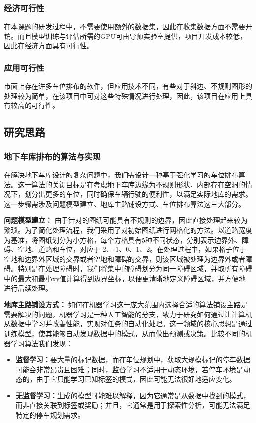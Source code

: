 \subsubsection{经济可行性}
在本课题的研发过程中，不需要使用额外的数据集，因此在收集数据方面不需要开销。而且模型训练与评估所需的GPU可由导师实验室提供，项目开发成本较低，因此在经济方面具有可行性。
\subsubsection{应用可行性}
市面上存在许多车位排布的软件，但应用技术不同，有些对于斜边、不规则图形的处理较为简单，在该项目中可对这些特殊情况进行处理，因此，该项目在应用上具有较高的可行性。
\subsection{研究思路}
\subsubsection{地下车库排布的算法与实现}
在解决地下车库设计的复杂问题中，我们需设计一种基于强化学习的车位排布算法。这一算法的关键目标是在考虑地下车库边缘为不规则形状、内部存在空洞的情况下，划分出更多的车位，同时确保车辆行驶的便利性，以满足实际地库的需求。这一步骤需涉及问题模型建立、地库主路铺设方式、车位排布算法这三大部分。

{\bfseries 问题模型建立：}
由于针对的图纸可能具有不规则的边界，因此直接处理起来较为繁琐。为了简化处理流程，我们采用了对初始图纸进行网格化的方法。以道路宽度为基准，将图纸划分为小方格，每个方格具有5种不同状态，分别表示边界外、障碍、空地、道路和车位，对应于-2、-1、0、1、2。在处理过程中，如果格子位于空地和边界外区域的交界或者空地和障碍的交界，则该区域被处理为边界外或者障碍。特别是在处理障碍时，我们将集中的障碍划分为同一障碍区域，并取所有障碍中的最大和最小xy值计算得到边界坐标，以便更清晰地定义障碍区域，并方便地进行后续处理。

{\bfseries 地库主路铺设方式：}
如何在机器学习这一庞大范围内选择合适的算法铺设主路是需要解决的问题。机器学习是一种人工智能的分支，致力于研究如何通过让计算机从数据中学习并改善性能，实现对任务的自动化处理。这一领域的核心思想是通过训练模型，使其能够自动发现数据中的模式，从而做出预测或决策。比较不同的机器学习算法我们发现：
\begin{itemize}
    \item {\bfseries 监督学习：}要大量的标记数据，而在车位规划中，获取大规模标记的停车数据可能会非常昂贵且困难；同时，监督学习不适用于动态环境，若停车环境是动态的，由于它只能学习已知标签的模式，因此可能无法很好地适应变化。
    \item {\bfseries 无监督学习：}生成的模型可能难以解释，因为它通常是从数据中找到的模式，而非直接关联到标签或奖励；并且，它通常是用于探索性分析，可能无法满足特定的停车规划需求。
\end{itemize}

